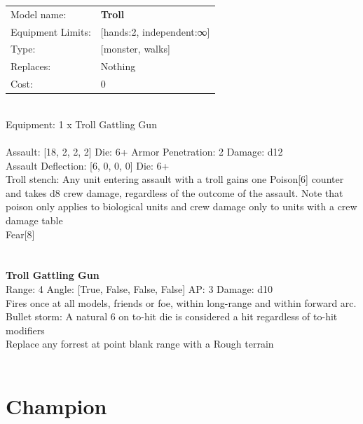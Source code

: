 \noindent
\begin{tabular}{ll}
Model name: &{\bf Troll } \\
Equipment Limits: &[hands:2, independent:∞] \\
Type: &[monster, walks] \\
Replaces: &Nothing \\
Cost: & 0\\
\end{tabular}
\ \\
Equipment: 1 x Troll Gattling Gun \\
\ \\
Assault: [18, 2, 2, 2] Die: 6+ Armor Penetration: 2 Damage: d12 \\
Assault Deflection: [6, 0, 0, 0] Die: 6+\\
\indent Troll stench: Any unit entering assault with a troll gains one Poison[6] counter and takes d8 crew damage, regardless of the outcome of the assault. Note that poison only applies to biological units and crew damage only to units with a crew damage table\\ 
Fear[8]\\ 
 
\ \\

\ \\
{\bf Troll Gattling Gun } \\



Range: 4  Angle: [True, False, False, False] AP: 3 Damage: d10 \\
Fires once at all models, friends or foe, within long-range and within forward arc.\\ 
Bullet storm: A natural 6 on to-hit die is considered a hit regardless of to-hit modifiers\\ 
Replace any forrest at point blank range with a Rough terrain\\ 




 
\ \\













\clearpage

\section{ Champion }

